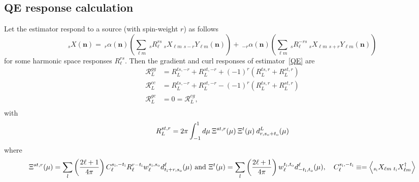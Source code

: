 \documentclass{article}
\newcommand{\si}[0]{{s_{\rm i}}}
\newcommand{\ti}[0]{{t_{\rm i}}}
\newcommand{\so}[0]{{s_{\rm o}}}
\renewcommand{\to}[0]{{t_{\rm o}}}
\newcommand{\Ylm}[1]{\:_{#1}Y_{\ell m}}
\newcommand{\av}[1]{\left\langle #1 \right\rangle}
\newcommand{\resp}{ {\mathcal R} }
\newcommand{\hn}[0]{\boldsymbol{n}}
\begin{document}
\subsection{QE response calculation}
Let the estimator respond to a source (with spin-weight $r$) as follows
\begin{equation}
	_{s}X(\hn) = \:_{r}\alpha(\hn) \left( \sum_{\ell m}\: _{s}R_\ell^{r s} \:_sX_{\ell m} \Ylm {s- r}(\hn)\right) + \:_{-r}\alpha(\hn) \left( \sum_{\ell m}\: _{s}R_\ell^{-r s} \:_sX_{\ell m} \Ylm {s + r}(\hn) \right)
\end{equation}
for some harmonic space responses $R_\ell^{rs}$. Then the gradient and curl responses of estimator~\eqref{QE} are
\begin{equation}\boxed{
	\begin{split}
		\resp^{gg}_L &= R_L^{ts, -r} + R_L^{st, -r} + (-1)^r \left(  R_L^{ts, r} + R_L^{st, r}\right) \\
		\resp^{cc}_L &= R_L^{ts, -r} + R_L^{st, -r} - (-1)^r \left(  R_L^{ts, r} + R_L^{st, r}\right) \\
		\resp^{gc}_L &= 0 = \resp^{cg}_L, \\
	\end{split}}
\end{equation}
with
\begin{equation}
R_L^{st, r} = 2\pi \int_{-1}^1d\mu\:\Xi^{st, r}(\mu)\:\Xi^{t}(\mu) \:d^L_{r, \so + \to}(\mu)
\end{equation}
where
\begin{equation}
	\Xi^{st, r}(\mu) = \sum_{l}\left(\frac{2\ell + 1}{4\pi}\right) C_\ell^{\si,-\ti} R^{r - \ti}_\ell w^{\si,\so}_\ell d^\ell_{\ti + r, \so}(\mu) \textrm{  and   } \Xi^{t}(\mu) = \sum_{l}\left(\frac{2\ell + 1}{4\pi}\right) w^{\ti,\to}_\ell d^\ell_{-\ti, \to}(\mu), \quad C_\ell^{\si, -\ti} \equiv = \av{_{\si}X_{\ell m}\: _{\ti}X^\dagger_{\ell m}}
\end{equation}
\clearpage
\newpage
\end{document}
